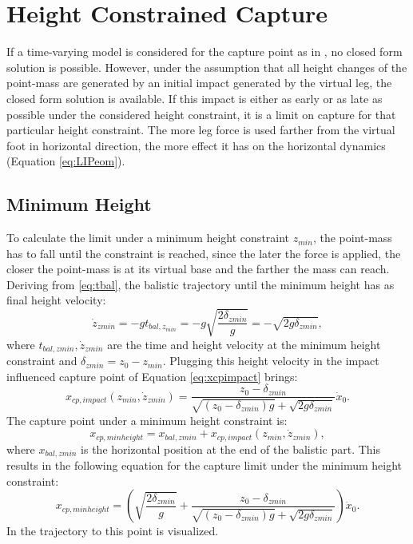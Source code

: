 \section{Height Constrained Capture}
If a time-varying model is considered for the capture point as in \cite{hopkins2014humanoid}, no closed form solution is possible. However, under the assumption that all height changes of the point-mass are generated by an initial impact generated by the virtual leg, the closed form solution is available. If this impact is either as early or as late as possible under the considered height constraint, it is a limit on capture for that particular height constraint. The more leg force is used farther from the virtual foot in horizontal direction, the more effect it has on the horizontal dynamics (Equation \eqref{eq:LIPeom}).\\
\subsection{Minimum Height}
To calculate the limit under a minimum height constraint $z_{min}$, the point-mass has to fall until the constraint is reached, since the later the force is applied, the closer the point-mass is at its virtual base and the farther the mass can reach. Deriving from \ref{eq:tbal}, the balistic trajectory until the minimum height has as final height velocity:
\begin{equation}
	\dot{z}_{zmin} = -gt_{bal,z_{min}} = -g\sqrt{\frac{2\delta_{zmin}}{g}} = -\sqrt{2g\delta_{zmin}},
\end{equation}
where $t_{bal,zmin}, \dot{z}_{zmin}$ are the time and height velocity at the minimum height constraint and $\delta_{zmin}=z_0-z_{min}$. Plugging this height velocity in the impact influenced capture point of Equation \eqref{eq:xcpimpact} brings:
\begin{equation}
	x_{cp,impact}(z_{min}, \dot{z}_{zmin})= \frac{z_0-\delta_{zmin}}{\sqrt{(z_0-\delta_{zmin})g}+\sqrt{2g\delta_{zmin}}}\dot{x}_0.
\end{equation}
The capture point under a minimum height constraint is:
\begin{equation}
	x_{cp,minheight} =x_{bal,zmin}+x_{cp,impact}(z_{min}, \dot{z}_{zmin}) ,
\end{equation}
where  $x_{bal,zmin}$ is the horizontal position at the end of the balistic part. This results in the following equation for the capture limit under the minimum height constraint:
\begin{equation}
 x_{cp,minheight}=(\sqrt{\frac{2\delta_{zmin}}{g}} +\frac{z_0-\delta_{zmin}}{\sqrt{(z_0-\delta_{zmin})g}+\sqrt{2g\delta_{zmin}}})\dot{x}_0.
\end{equation}
In  the trajectory to this point is visualized.
